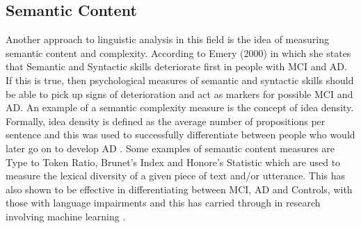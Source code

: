 \documentclass{article}
\begin{document}
\subsection{Semantic Content}
Another approach to linguistic analysis in this field is the idea of measuring semantic content and complexity. According to Emery (2000) \cite{Emery2000} in which she states that Semantic and Syntactic skills deteriorate first in people with MCI and AD. If this is true, then psychological measures of semantic and syntactic skills should be able to pick up signs of deterioration and act as markers for possible MCI and AD. An example of a semantic complexity measure is the concept of idea density. Formally, idea density is defined as the average number of propositions per sentence \cite{Kintsch1973} and this was used to successfully differentiate between people who would later go on to develop AD \cite{Snowdon1996}. Some examples of semantic content measures are Type to Token Ratio, Brunet's Index and Honore's Statistic  which are used to measure the lexical diversity of a given piece of text and/or utterance.  This has also shown to be effective in differentiating between MCI, AD and Controls, with those with language impairments \cite{Bucks2000} and this has carried through in research involving machine learning \cite{Wang2016, Thomas2005}.  \newline
\par
\end{document}
